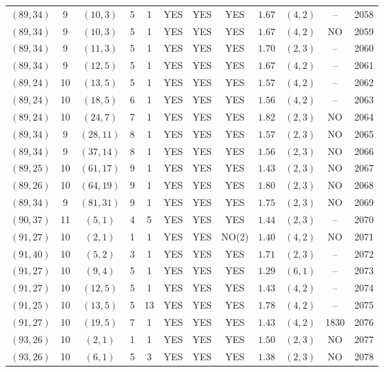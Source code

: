 \begin{longtable}{|c|c|c|c|c|c|c|c|c|c|c|c|}
$(89,34)$ & 9 & $(10,3)$ & 5 & 1 & YES & YES & YES & $1.67$ & $(4,2)$ & -- & 2058\\
$(89,34)$ & 9 & $(10,3)$ & 5 & 1 & YES & YES & YES & $1.67$ & $(4,2)$ & NO & 2059\\
$(89,34)$ & 9 & $(11,3)$ & 5 & 1 & YES & YES & YES & $1.70$ & $(2,3)$ & -- & 2060\\
$(89,34)$ & 9 & $(12,5)$ & 5 & 1 & YES & YES & YES & $1.67$ & $(4,2)$ & -- & 2061\\
$(89,24)$ & 10 & $(13,5)$ & 5 & 1 & YES & YES & YES & $1.57$ & $(4,2)$ & -- & 2062\\
$(89,24)$ & 10 & $(18,5)$ & 6 & 1 & YES & YES & YES & $1.56$ & $(4,2)$ & -- & 2063\\
$(89,24)$ & 10 & $(24,7)$ & 7 & 1 & YES & YES & YES & $1.82$ & $(2,3)$ & NO & 2064\\
$(89,34)$ & 9 & $(28,11)$ & 8 & 1 & YES & YES & YES & $1.57$ & $(2,3)$ & NO & 2065\\
$(89,34)$ & 9 & $(37,14)$ & 8 & 1 & YES & YES & YES & $1.56$ & $(2,3)$ & NO & 2066\\
$(89,25)$ & 10 & $(61,17)$ & 9 & 1 & YES & YES & YES & $1.43$ & $(2,3)$ & NO & 2067\\
$(89,26)$ & 10 & $(64,19)$ & 9 & 1 & YES & YES & YES & $1.80$ & $(2,3)$ & NO & 2068\\
$(89,34)$ & 9 & $(81,31)$ & 9 & 1 & YES & YES & YES & $1.75$ & $(2,3)$ & NO & 2069\\
$(90,37)$ & 11 & $(5,1)$ & 4 & 5 & YES & YES & YES & $1.44$ & $(2,3)$ & -- & 2070\\
$(91,27)$ & 10 & $(2,1)$ & 1 & 1 & YES & YES & NO(2) & $1.40$ & $(4,2)$ & NO & 2071\\
$(91,40)$ & 10 & $(5,2)$ & 3 & 1 & YES & YES & YES & $1.71$ & $(2,3)$ & -- & 2072\\
$(91,27)$ & 10 & $(9,4)$ & 5 & 1 & YES & YES & YES & $1.29$ & $(6,1)$ & -- & 2073\\
$(91,27)$ & 10 & $(12,5)$ & 5 & 1 & YES & YES & YES & $1.43$ & $(4,2)$ & -- & 2074\\
$(91,25)$ & 10 & $(13,5)$ & 5 & 13 & YES & YES & YES & $1.78$ & $(4,2)$ & -- & 2075\\
$(91,27)$ & 10 & $(19,5)$ & 7 & 1 & YES & YES & YES & $1.43$ & $(4,2)$ & 1830 & 2076\\
$(93,26)$ & 10 & $(2,1)$ & 1 & 1 & YES & YES & YES & $1.50$ & $(2,3)$ & NO & 2077\\
$(93,26)$ & 10 & $(6,1)$ & 5 & 3 & YES & YES & YES & $1.38$ & $(2,3)$ & NO & 2078\\

\end{longtable}
